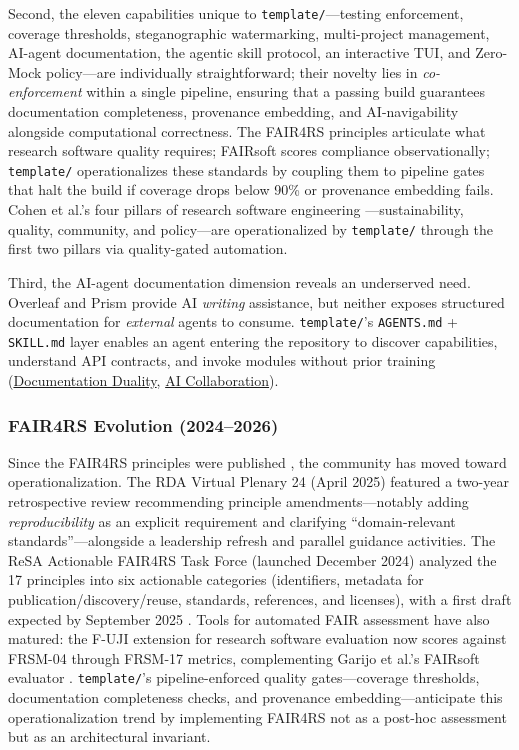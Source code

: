 \documentclass[
]{article}
\begin{document}
Second, the eleven capabilities unique to \texttt{template/}---testing
enforcement, coverage thresholds, steganographic watermarking,
multi-project management, AI-agent documentation, the agentic skill
protocol, an interactive TUI, and Zero-Mock policy---are individually
straightforward; their novelty lies in \emph{co-enforcement} within a
single pipeline, ensuring that a passing build guarantees documentation
completeness, provenance embedding, and AI-navigability alongside
computational correctness. The FAIR4RS principles
\citep{barker2022fair4rs, lamprecht2020towards} articulate what research
software quality requires; FAIRsoft \citep{garijo2024fairsoft} scores
compliance observationally; \texttt{template/} operationalizes these
standards by coupling them to pipeline gates that halt the build if
coverage drops below 90\% or provenance embedding fails. Cohen et al.'s
four pillars of research software engineering
\citep{cohen2021four}---sustainability, quality, community, and
policy---are operationalized by \texttt{template/} through the first two
pillars via quality-gated automation.

Third, the AI-agent documentation dimension reveals an underserved need.
Overleaf and Prism provide AI \emph{writing} assistance, but neither
exposes structured documentation for \emph{external} agents to consume.
\texttt{template/}'s \texttt{AGENTS.md} + \texttt{SKILL.md} layer
enables an agent entering the repository to discover capabilities,
understand API contracts, and invoke modules without prior training
(\href{03c_documentation.md\#documentation-duality-and-ai-collaboration}{Documentation
Duality}, \href{05d_ai_collaboration.md\#the-ai-collaboration-model}{AI
Collaboration}).

\subsubsection{FAIR4RS Evolution
(2024--2026)}\label{fair4rs-evolution-20242026}

Since the FAIR4RS principles were published \citep{barker2022fair4rs},
the community has moved toward operationalization. The RDA Virtual
Plenary 24 (April 2025) featured a two-year retrospective review
\citep{honeyman2024fair4rs} recommending principle amendments---notably
adding \emph{reproducibility} as an explicit requirement and clarifying
``domain-relevant standards''---alongside a leadership refresh and
parallel guidance activities. The ReSA Actionable FAIR4RS Task Force
(launched December 2024) analyzed the 17 principles into six actionable
categories (identifiers, metadata for publication/discovery/reuse,
standards, references, and licenses), with a first draft expected by
September 2025 \citep{resa2024actionable}. Tools for automated FAIR
assessment have also matured: the F-UJI extension for research software
evaluation now scores against FRSM-04 through FRSM-17 metrics,
complementing Garijo et al.'s FAIRsoft evaluator
\citep{garijo2024fairsoft}. \texttt{template/}'s pipeline-enforced
quality gates---coverage thresholds, documentation completeness checks,
and provenance embedding---anticipate this operationalization trend by
implementing FAIR4RS not as a post-hoc assessment but as an
architectural invariant.
\end{document}
